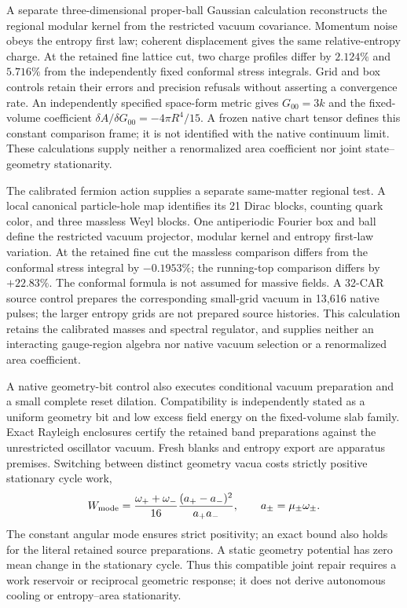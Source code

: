 A separate three-dimensional proper-ball Gaussian calculation reconstructs
the regional modular kernel from the restricted vacuum covariance. Momentum
noise obeys the entropy first law; coherent displacement gives the same
relative-entropy charge. At the retained fine lattice cut, two charge
profiles differ by \(2.124\%\) and \(5.716\%\) from the independently fixed
conformal stress integrals. Grid and box controls retain their errors and
precision refusals without asserting a convergence rate. An independently
specified space-form metric gives \(G_{00}=3k\) and the fixed-volume
coefficient \(\delta A/\delta G_{00}=-4\pi R^4/15\). A frozen native chart
tensor defines this constant comparison frame; it is not identified with
the native continuum limit. These calculations supply neither a
renormalized area coefficient nor joint state--geometry stationarity.

The calibrated fermion action supplies a separate same-matter regional test.
A local canonical particle-hole map identifies its 21 Dirac blocks, counting quark color,
and three massless Weyl blocks. One antiperiodic Fourier box and ball define
the restricted vacuum projector, modular kernel and entropy first-law
variation. At the retained fine cut the massless comparison differs from
the conformal stress integral by \(-0.1953\%\); the running-top comparison
differs by \(+22.83\%\). The conformal formula is not assumed for massive
fields. A 32-CAR source control prepares the corresponding small-grid
vacuum in 13,616 native pulses; the larger entropy grids are not prepared
source histories. This calculation retains the calibrated masses and
spectral regulator, and supplies neither an interacting gauge-region
algebra nor native vacuum selection or a renormalized area coefficient.

A native geometry-bit control also executes conditional vacuum preparation
and a small complete reset dilation. Compatibility is independently stated
as a uniform geometry bit and low excess field energy on the fixed-volume
slab family. Exact Rayleigh enclosures certify the retained band preparations
against the unrestricted oscillator vacuum. Fresh blanks and entropy export
are apparatus premises. Switching between distinct geometry vacua costs
strictly positive stationary cycle work,
\[
 W_{\rm mode}=\frac{\omega_++\omega_-}{16}
       \frac{(a_+-a_-)^2}{a_+a_-},\qquad a_\pm=\mu_\pm\omega_\pm.
\]
The constant angular mode ensures strict positivity; an exact bound also
holds for the literal retained source preparations. A static geometry
potential has zero mean change in the stationary cycle. Thus this compatible
joint repair requires a work reservoir or reciprocal geometric response;
it does not derive autonomous cooling or entropy--area stationarity.

